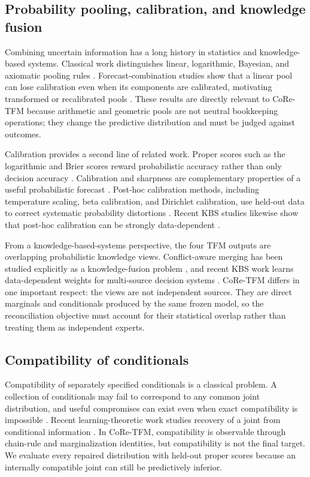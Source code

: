 \documentclass[a4paper,fleqn]{cas-sc}
\begin{document}
\subsection{Probability pooling, calibration, and knowledge fusion}
Combining uncertain information has a long history in statistics and knowledge-based systems. Classical work distinguishes linear, logarithmic, Bayesian, and axiomatic pooling rules \citep{genest1986combining,heskes1997opinion}. Forecast-combination studies show that a linear pool can lose calibration even when its components are calibrated, motivating transformed or recalibrated pools \citep{ranjan2010combining,gneiting2013combining}. These results are directly relevant to CoRe-TFM because arithmetic and geometric pools are not neutral bookkeeping operations; they change the predictive distribution and must be judged against outcomes.

Calibration provides a second line of related work. Proper scores such as the logarithmic and Brier scores reward probabilistic accuracy rather than only decision accuracy \citep{brier1950,gneiting2007strictly}. Calibration and sharpness are complementary properties of a useful probabilistic forecast \citep{gneiting2007calibration}. Post-hoc calibration methods, including temperature scaling, beta calibration, and Dirichlet calibration, use held-out data to correct systematic probability distortions \citep{guo2017calibration,kull2017beta,kull2019dirichlet}. Recent KBS studies likewise show that post-hoc calibration can be strongly data-dependent \citep{shaker2025rfcalibration}.

From a knowledge-based-systems perspective, the four TFM outputs are overlapping probabilistic knowledge views. Conflict-aware merging has been studied explicitly as a knowledge-fusion problem \citep{hunter2006merging}, and recent KBS work learns data-dependent weights for multi-source decision systems \citep{zhang2025dynamicfusion}. CoRe-TFM differs in one important respect: the views are not independent sources. They are direct marginals and conditionals produced by the same frozen model, so the reconciliation objective must account for their statistical overlap rather than treating them as independent experts.

\subsection{Compatibility of conditionals}
Compatibility of separately specified conditionals is a classical problem. A collection of conditionals may fail to correspond to any common joint distribution, and useful compromises can exist even when exact compatibility is impossible \citep{mure2017compromise}. Recent learning-theoretic work studies recovery of a joint from conditional information \citep{majid2025consistent}. In CoRe-TFM, compatibility is observable through chain-rule and marginalization identities, but compatibility is not the final target. We evaluate every repaired distribution with held-out proper scores because an internally compatible joint can still be predictively inferior.
\end{document}
